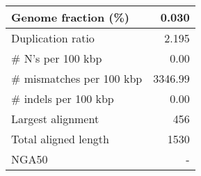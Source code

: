 \documentclass[12pt,a4paper]{article}
\begin{document}
\begin{table}[ht]
\begin{center}
\begin{tabular}{|l*{1}{|r}|}
Genome fraction (\%) & 0.030 \\ \hline
Duplication ratio & 2.195 \\ \hline
\# N's per 100 kbp & 0.00 \\ \hline
\# mismatches per 100 kbp & 3346.99 \\ \hline
\# indels per 100 kbp & 0.00 \\ \hline
Largest alignment & 456 \\ \hline
Total aligned length & 1530 \\ \hline
NGA50 & - \\ \hline
\end{tabular}
\end{center}
\end{table}
\end{document}

